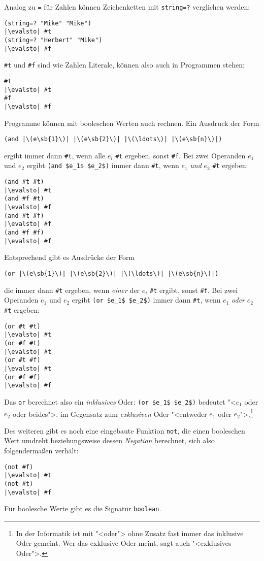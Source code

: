 Analog zu \lstinline{=} für Zahlen können Zeichenketten mit
\lstinline{string=?} verglichen werden:
\begin{lstlisting}
(string=? "Mike" "Mike")
|\evalsto| #t
(string=? "Herbert" "Mike")
|\evalsto| #f
\end{lstlisting}
%
\lstinline{#t} und \lstinline{#f} sind wie Zahlen Literale, können also
auch in Programmen stehen:
%
\begin{lstlisting}
#t
|\evalsto| #t
#f
|\evalsto| #f
\end{lstlisting}
%
Programme können mit booleschen Werten auch rechnen.  Ein Ausdruck der
Form
%
\begin{lstlisting}
(and |\(e\sb{1}\)| |\(e\sb{2}\)| |\(\ldots\)| |\(e\sb{n}\)|)
\end{lstlisting}
%
ergibt immer dann \lstinline{#t}, wenn alle $e_i$ \lstinline{#t} ergeben, sonst
\lstinline{#f}.  Bei zwei Operanden $e_1$ und $e_2$ ergibt
\lstinline{(and $e_1$ $e_2$)} immer dann \lstinline{#t}, wenn $e_1$ \emph{und} $e_2$
\lstinline{#t} ergeben:\label{page:and}
%
\begin{lstlisting}
(and #t #t)
|\evalsto| #t
(and #f #t)
|\evalsto| #f
(and #t #f)
|\evalsto| #f
(and #f #f)
|\evalsto| #f
\end{lstlisting}
%
Entsprechend gibt es Ausdrücke der Form
%
\begin{lstlisting}
(or |\(e\sb{1}\)| |\(e\sb{2}\)| |\(\ldots\)| |\(e\sb{n}\)|)
\end{lstlisting}
%
die immer dann \lstinline{#t} ergeben, wenn \emph{einer} der $e_i$ \lstinline{#t} ergibt, sonst
\lstinline{#f}.  Bei zwei Operanden $e_1$ und $e_2$ ergibt
\lstinline{(or $e_1$ $e_2$)} immer dann \lstinline{#t}, wenn $e_1$ \emph{oder} $e_2$
\lstinline{#t} ergeben:
%
\begin{lstlisting}
(or #t #t)
|\evalsto| #t
(or #f #t)
|\evalsto| #t
(or #t #f)
|\evalsto| #t
(or #f #f)
|\evalsto| #f
\end{lstlisting}
%
Das \lstinline{or} berechnet also ein \textit{inklusives}
Oder: \lstinline{(or $e_1$ $e_2$)} bedeutet "<$e_1$ oder
$e_2$ oder beides">, im Gegensatz zum \textit{exklusiven}
Oder "<entweder $e_1$ oder
$e_2$">.\footnote{In der Informatik ist mit "<oder"> ohne Zusatz fast
  immer das inklusive Oder gemeint. Wer das exklusive Oder meint, sagt
  auch "<exklusives Oder">.}

Des weiteren gibt es noch eine eingebaute Funktion
\lstinline{not}, die einen booleschen Wert
umdreht beziehungsweise dessen \textit{Negation}
berechnet, sich also folgendermaßen verhält:
%
\begin{lstlisting}
(not #f)
|\evalsto| #t
(not #t)
|\evalsto| #f
\end{lstlisting}
%
Für boolesche Werte gibt es die Signatur
\lstinline{boolean}.

